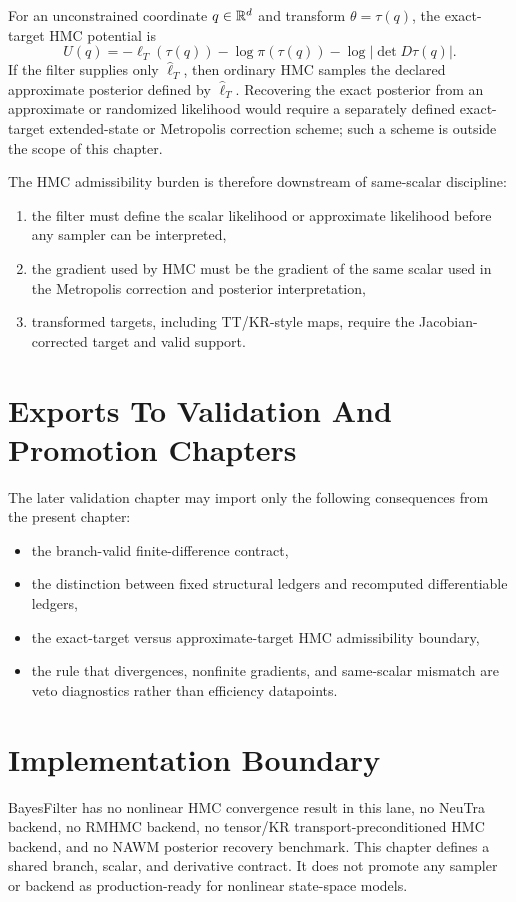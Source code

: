 For an unconstrained coordinate \(q\in\mathbb{R}^d\) and transform
\(\theta=\tau(q)\), the exact-target HMC potential is
\begin{equation}
  U(q)
  =
  -\ell_T(\tau(q))-
  \log \pi(\tau(q))-
  \log\left|\det D\tau(q)\right|.
  \label{eq:bf-hd-hmc-potential-live}
\end{equation}
If the filter supplies only \(\widehat\ell_T\), then ordinary HMC samples the
declared approximate posterior defined by \(\widehat\ell_T\).  Recovering the
exact posterior from an approximate or randomized likelihood would require a
separately defined exact-target extended-state or Metropolis correction scheme;
such a scheme is outside the scope of this chapter.

The HMC admissibility burden is therefore downstream of same-scalar discipline:
\begin{enumerate}[label=(\arabic*), leftmargin=0.28in]
  \item the filter must define the scalar likelihood or approximate likelihood
  before any sampler can be interpreted,
  \item the gradient used by HMC must be the gradient of the same scalar used in
  the Metropolis correction and posterior interpretation,
  \item transformed targets, including TT/KR-style maps, require the
  Jacobian-corrected target and valid support.
\end{enumerate}

\section{Exports To Validation And Promotion Chapters}
\label{sec:bf-hd-fixed-branch-exports}

The later validation chapter may import only the following consequences from the
present chapter:
\begin{itemize}[leftmargin=0.28in]
  \item the branch-valid finite-difference contract,
  \item the distinction between fixed structural ledgers and recomputed
  differentiable ledgers,
  \item the exact-target versus approximate-target HMC admissibility boundary,
  \item the rule that divergences, nonfinite gradients, and same-scalar mismatch
  are veto diagnostics rather than efficiency datapoints.
\end{itemize}

\section{Implementation Boundary}
\label{sec:bf-hd-hmc-boundary}

BayesFilter has no nonlinear HMC convergence result in this lane, no NeuTra
backend, no RMHMC backend, no tensor/KR transport-preconditioned HMC backend,
and no NAWM posterior recovery benchmark.  This chapter defines a shared branch,
scalar, and derivative contract.  It does not promote any sampler or backend as
production-ready for nonlinear state-space models.
